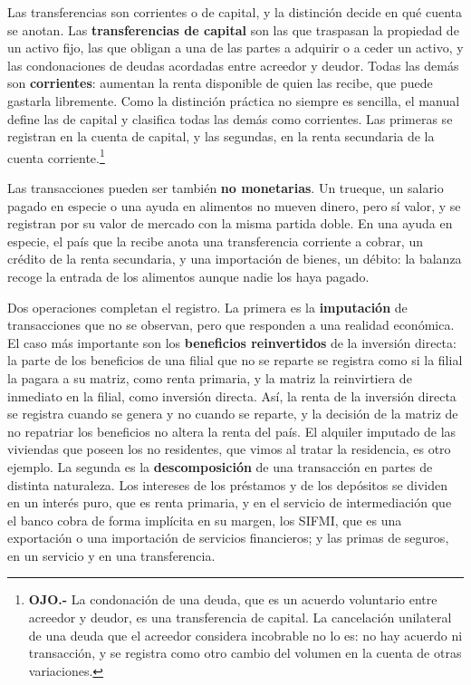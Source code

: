 \documentclass[10pt,a4paper]{article}
\begin{document}
Las transferencias son corrientes o de capital, y la distinción decide en qué cuenta se anotan. Las \textbf{transferencias de capital} son las que traspasan la propiedad de un activo fijo, las que obligan a una de las partes a adquirir o a ceder un activo, y las condonaciones de deudas acordadas entre acreedor y deudor. Todas las demás son \textbf{corrientes}: aumentan la renta disponible de quien las recibe, que puede gastarla libremente. Como la distinción práctica no siempre es sencilla, el manual define las de capital y clasifica todas las demás como corrientes. Las primeras se registran en la cuenta de capital, y las segundas, en la renta secundaria de la cuenta corriente.\footnote{%
    \textbf{OJO.-} La condonación de una deuda, que es un acuerdo voluntario entre acreedor y deudor, es una transferencia de capital. La cancelación unilateral de una deuda que el acreedor considera incobrable no lo es: no hay acuerdo ni transacción, y se registra como otro cambio del volumen en la cuenta de otras variaciones.
}

Las transacciones pueden ser también \textbf{no monetarias}. Un trueque, un salario pagado en especie o una ayuda en alimentos no mueven dinero, pero sí valor, y se registran por su valor de mercado con la misma partida doble. En una ayuda en especie, el país que la recibe anota una transferencia corriente a cobrar, un crédito de la renta secundaria, y una importación de bienes, un débito: la balanza recoge la entrada de los alimentos aunque nadie los haya pagado.

Dos operaciones completan el registro. La primera es la \textbf{imputación} de transacciones que no se observan, pero que responden a una realidad económica. El caso más importante son los \textbf{beneficios reinvertidos} de la inversión directa: la parte de los beneficios de una filial que no se reparte se registra como si la filial la pagara a su matriz, como renta primaria, y la matriz la reinvirtiera de inmediato en la filial, como inversión directa. Así, la renta de la inversión directa se registra cuando se genera y no cuando se reparte, y la decisión de la matriz de no repatriar los beneficios no altera la renta del país. El alquiler imputado de las viviendas que poseen los no residentes, que vimos al tratar la residencia, es otro ejemplo. La segunda es la \textbf{descomposición} de una transacción en partes de distinta naturaleza. Los intereses de los préstamos y de los depósitos se dividen en un interés puro, que es renta primaria, y en el servicio de intermediación que el banco cobra de forma implícita en su margen, los SIFMI, que es una exportación o una importación de servicios financieros; y las primas de seguros, en un servicio y en una transferencia.
\end{document}
